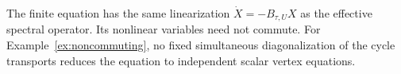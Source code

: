 The finite equation has the same linearization
$\dot X=-B_{\tau,U}X$ as the effective spectral
operator. Its nonlinear variables need not commute.
For Example~\ref{ex:noncommuting}, no fixed simultaneous
diagonalization of the cycle transports reduces the
equation to independent scalar vertex equations.
